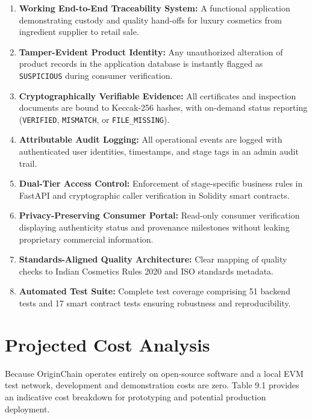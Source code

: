 \documentclass[12pt,a4paper]{report}
\begin{document}
\begin{enumerate}[leftmargin=1.8em, itemsep=4pt, parsep=0pt]
    \item \textbf{Working End-to-End Traceability System:} A functional application demonstrating custody and quality hand-offs for luxury cosmetics from ingredient supplier to retail sale.
    \item \textbf{Tamper-Evident Product Identity:} Any unauthorized alteration of product records in the application database is instantly flagged as \texttt{SUSPICIOUS} during consumer verification.
    \item \textbf{Cryptographically Verifiable Evidence:} All certificates and inspection documents are bound to Keccak-256 hashes, with on-demand status reporting (\texttt{VERIFIED}, \texttt{MISMATCH}, or \texttt{FILE\_MISSING}).
    \item \textbf{Attributable Audit Logging:} All operational events are logged with authenticated user identities, timestamps, and stage tags in an admin audit trail.
    \item \textbf{Dual-Tier Access Control:} Enforcement of stage-specific business rules in FastAPI and cryptographic caller verification in Solidity smart contracts.
    \item \textbf{Privacy-Preserving Consumer Portal:} Read-only consumer verification displaying authenticity status and provenance milestones without leaking proprietary commercial information.
    \item \textbf{Standards-Aligned Quality Architecture:} Clear mapping of quality checks to Indian Cosmetics Rules 2020 and ISO standards metadata.
    \item \textbf{Automated Test Suite:} Complete test coverage comprising 51 backend tests and 17 smart contract tests ensuring robustness and reproducibility.
\end{enumerate}

\chapter{Projected Cost Analysis}

Because OriginChain operates entirely on open-source software and a local EVM test network, development and demonstration costs are zero. Table 9.1 provides an indicative cost breakdown for prototyping and potential production deployment.
\end{document}
